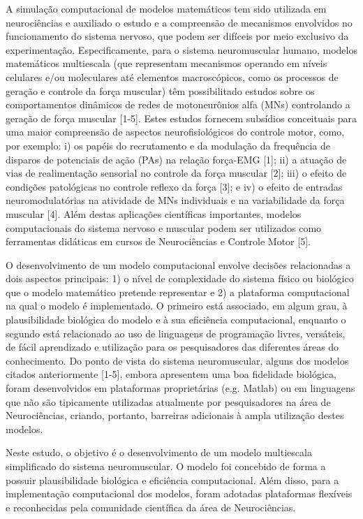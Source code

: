 A simulação computacional de modelos matemáticos tem sido utilizada em neurociências e auxiliado o estudo e a compreensão de mecanismos envolvidos no funcionamento do sistema nervoso, que podem ser difíceis por meio exclusivo da experimentação. Especificamente, para o sistema neuromuscular humano, modelos matemáticos multiescala (que representam mecanismos operando em níveis celulares e/ou moleculares até elementos macroscópicos, como os processos de geração e controle da força muscular) têm possibilitado estudos sobre os comportamentos dinâmicos de redes de motoneurônios alfa (MNs) controlando a geração de força muscular [1-5]. Estes estudos fornecem subsídios conceituais para uma maior compreensão de aspectos neurofisiológicos do controle motor, como, por exemplo: i) os papéis do recrutamento e da modulação da frequência de disparos de potenciais de ação (PAs) na relação força-EMG [1]; ii) a atuação de vias de realimentação sensorial no controle da força muscular [2]; iii) o efeito de condições patológicas no controle reflexo da força [3]; e iv) o efeito de entradas neuromodulatórias na atividade de MNs individuais e na variabilidade da força muscular [4]. Além destas aplicações científicas importantes, modelos computacionais do sistema nervoso e muscular podem ser utilizados como ferramentas didáticas em cursos de Neurociências e Controle Motor [5].

O desenvolvimento de um modelo computacional envolve decisões relacionadas a dois aspectos principais: 1) o nível de complexidade do sistema físico ou biológico que o modelo matemático pretende representar e 2) a plataforma computacional na qual o modelo é implementado. O primeiro está associado, em algum grau, à plausibilidade biológica do modelo e à sua eficiência computacional, enquanto o segundo está relacionado ao uso de linguagens de programação livres, versáteis, de fácil aprendizado e utilização para os pesquisadores das diferentes áreas do conhecimento. Do ponto de vista do sistema neuromuscular, alguns dos modelos citados anteriormente [1-5], embora apresentem uma boa fidelidade biológica, foram desenvolvidos em plataformas proprietárias (e.g. Matlab) ou em linguagens que não são tipicamente utilizadas atualmente por pesquisadores na área de Neurociências, criando, portanto, barreiras adicionais à ampla utilização destes modelos.

Neste estudo, o objetivo é o desenvolvimento de um modelo multiescala simplificado do sistema neuromuscular. O modelo foi concebido de forma a possuir plausibilidade biológica e eficiência computacional. Além disso, para a implementação computacional dos modelos, foram adotadas plataformas flexíveis e reconhecidas pela comunidade científica da área de Neurociências.